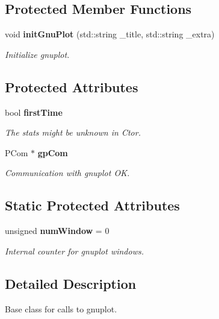 \subsection*{Protected Member Functions}
\begin{CompactItemize}
\item 
void {\bf init\-Gnu\-Plot} (std::string \_\-title, std::string \_\-extra)
\begin{CompactList}\small\item\em Initialize gnuplot. \item\end{CompactList}\end{CompactItemize}
\subsection*{Protected Attributes}
\begin{CompactItemize}
\item 
bool {\bf first\-Time}\label{classeo_gnuplot_p0}

\begin{CompactList}\small\item\em The stats might be unknown in Ctor. \item\end{CompactList}\item 
PCom $\ast$ {\bf gp\-Com}\label{classeo_gnuplot_p1}

\begin{CompactList}\small\item\em Communication with gnuplot OK. \item\end{CompactList}\end{CompactItemize}
\subsection*{Static Protected Attributes}
\begin{CompactItemize}
\item 
unsigned {\bf num\-Window} = 0\label{classeo_gnuplot_t0}

\begin{CompactList}\small\item\em Internal counter for gnuplot windows. \item\end{CompactList}\end{CompactItemize}


\subsection{Detailed Description}
Base class for calls to gnuplot. 

